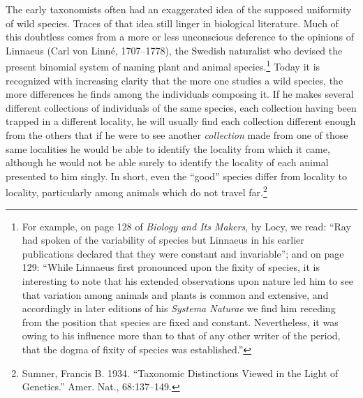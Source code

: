 The early taxonomists often had an exaggerated idea of the supposed
uniformity of wild species. Traces of that idea still linger in biological
literature. Much of this doubtless comes from a more or less
unconscious deference to the opinions of Linnaeus (Carl von Linn\'{e},
1707--1778), the Swedish naturalist who devised the present binomial
system of naming plant and animal species.\footnote{For example, on page 128 of
\textit{Biology and Its Makers}, by Locy, we read: ``Ray
had spoken of the variability of species but Linnaeus in his earlier publications
declared that they were constant and invariable''; and on page 129: ``While Linnaeus
first pronounced upon the fixity of species, it is interesting to note that his extended
observations upon nature led him to see that variation among animals and plants is
common and extensive, and accordingly in later editions of his \textit{Systema Naturae} we
find him receding from the position that species are fixed and constant. Nevertheless,
it was owing to his influence more than to that of any other writer of the period,
that the dogma of fixity of species was established.''} Today it is recognized with
increasing clarity that the more one studies a wild species, the more differences
he finds among the individuals composing it. If he makes several
different collections of individuals of the same species, each collection
having been trapped in a different locality, he will usually find each
collection different enough from the others that if he were to see another
\textit{collection} made from one of those same localities he would be able to
identify the locality from which it came, although he would not be able
surely to identify the locality of each animal presented to him singly. In
short, even the ``good'' species differ from locality to locality, particularly
among animals which do not travel far.\footnote{Sumner, Francis B. 1934.
``Taxonomic Distinctions Viewed in the Light of Genetics.'' Amer. Nat., 68:137--149.}

